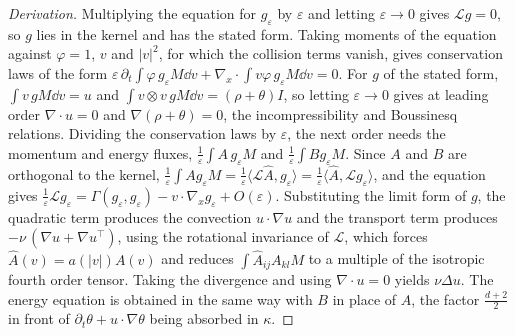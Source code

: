 \begin{proof}[Derivation]
Multiplying the equation for $g_\varepsilon$ by $\varepsilon$ and letting $\varepsilon\to0$ gives $\mathcal{L}g = 0$, so $g$ lies in the kernel and has the stated form. Taking moments of the equation against $\varphi = 1$, $v$ and $|v|^2$, for which the collision terms vanish, gives conservation laws of the form $\varepsilon\,\partial_t\int\varphi\,g_\varepsilon M\dd v+\nabla_x\cdot\int v\varphi\,g_\varepsilon M\dd v = 0$. For $g$ of the stated form, $\int v\,gM\dd v = u$ and $\int v\otimes v\,gM\dd v = (\rho+\theta)I$, so letting $\varepsilon\to0$ gives at leading order $\nabla\cdot u = 0$ and $\nabla(\rho+\theta) = 0$, the incompressibility and Boussinesq relations. Dividing the conservation laws by $\varepsilon$, the next order needs the momentum and energy fluxes, $\frac1\varepsilon\int A\,g_\varepsilon M$ and $\frac1\varepsilon\int Bg_\varepsilon M$. Since $A$ and $B$ are orthogonal to the kernel, $\frac1\varepsilon\int Ag_\varepsilon M = \frac1\varepsilon\langle\mathcal{L}\hat A,g_\varepsilon\rangle = \frac1\varepsilon\langle\hat A,\mathcal{L}g_\varepsilon\rangle$, and the equation gives $\frac1\varepsilon\mathcal{L}g_\varepsilon = \Gamma(g_\varepsilon,g_\varepsilon)-v\cdot\nabla_xg_\varepsilon+O(\varepsilon)$. Substituting the limit form of $g$, the quadratic term produces the convection $u\cdot\nabla u$ and the transport term produces $-\nu\,(\nabla u+\nabla u^\top)$, using the rotational invariance of $\mathcal{L}$, which forces $\hat A(v) = a(|v|)A(v)$ and reduces $\int\hat A_{ij}A_{kl}M$ to a multiple of the isotropic fourth order tensor. Taking the divergence and using $\nabla\cdot u = 0$ yields $\nu\Delta u$. The energy equation is obtained in the same way with $B$ in place of $A$, the factor $\frac{d+2}{2}$ in front of $\partial_t\theta+u\cdot\nabla\theta$ being absorbed in $\kappa$.
\end{proof}

